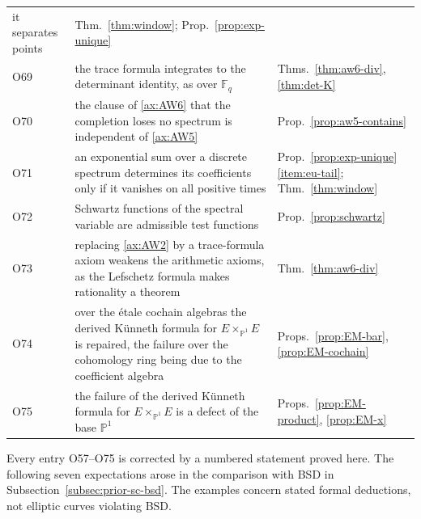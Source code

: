 \documentclass[11pt]{amsart}
\theoremstyle{plain}
\theoremstyle{definition}
\theoremstyle{remark}
\numberwithin{equation}{section}
\newcommand{\F}{\mathbb{F}}
\begin{document}
\begin{longtable}{@{}l>{\raggedright\arraybackslash}p{}
>{\raggedright\arraybackslash}p{}@{}}
  it separates points & Thm.~\ref{thm:window};
  Prop.~\ref{prop:exp-unique}\\
O69 & the trace formula integrates to the determinant identity, as over
  $\F_q$ & Thms.~\ref{thm:aw6-div}, \ref{thm:det-K}\\
O70 & the clause of \ref{ax:AW6} that the completion loses no spectrum
  is independent of \ref{ax:AW5} & Prop.~\ref{prop:aw5-contains}\\
O71 & an exponential sum over a discrete spectrum determines its
  coefficients only if it vanishes on all positive times &
  Prop.~\ref{prop:exp-unique}\ref{item:eu-tail};
  Thm.~\ref{thm:window}\\
O72 & Schwartz functions of the spectral variable are admissible test
  functions & Prop.~\ref{prop:schwartz}\\
O73 & replacing \ref{ax:AW2} by a trace-formula axiom weakens the
  arithmetic axioms, as the Lefschetz formula makes rationality a
  theorem & Thm.~\ref{thm:aw6-div}\\
O74 & over the \'etale cochain algebras the derived K\"unneth formula
  for $E\times_{\mathbb{P}^1}E$ is repaired, the failure over the
  cohomology ring being due to the coefficient algebra &
  Props.~\ref{prop:EM-bar}, \ref{prop:EM-cochain}\\
O75 & the failure of the derived K\"unneth formula for
  $E\times_{\mathbb{P}^1}E$ is a defect of the base $\mathbb{P}^1$ &
  Props.~\ref{prop:EM-product}, \ref{prop:EM-x}\\
\end{longtable}

Every entry O57--O75 is corrected by a numbered statement proved here.
The following seven expectations arose in the comparison with BSD in
Subsection~\ref{subsec:prior-sc-bsd}. The examples concern stated
formal deductions, not elliptic curves violating BSD.
\end{document}
